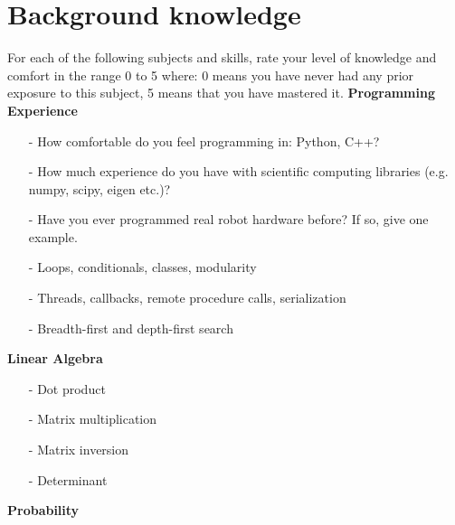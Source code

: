 \documentclass{article}
\begin{document}
\section{Background knowledge}
For each of the following subjects and skills, rate your level of knowledge and comfort in the range 0 to 5 where: 0 means you have never had any prior exposure to this subject, 5 means that you have mastered it.
\newline
\newline
\noindent \textbf{Programming Experience}
\begin{itemize}
\item[-] How comfortable do you feel programming in: Python,  C++?
\item[-] How much experience do you have with scientific computing libraries (e.g. numpy, scipy, eigen etc.)?
\item[-] Have you ever programmed real robot hardware before? If so, give one example.
\item[-] Loops, conditionals, classes, modularity
\item[-] Threads, callbacks, remote procedure calls, serialization
\item[-] Breadth-first and depth-first search
\end{itemize}
\quad
\newline
\newline
\newline
\noindent \textbf{Linear Algebra}
\begin{itemize}
\item[-] Dot product
\item[-] Matrix multiplication
\item[-] Matrix inversion
\item[-] Determinant
\end{itemize}
\quad
\newline
\noindent \textbf{Probability}
\end{document}
